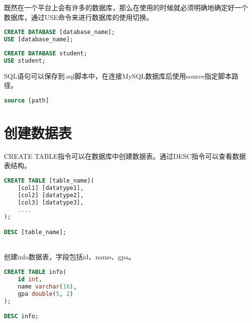 \documentclass[12pt, openany, oneside]{book}
\begin{document}
既然在一个平台上会有许多的数据库，那么在使用的时候就必须明确地确定好一个数据库，通过USE命令来进行数据库的使用切换。

\vspace{-0.5cm}

\begin{lstlisting}[language=SQL]
CREATE DATABASE [database_name];
USE [database_name];
\end{lstlisting}

\vspace{0.5cm}


\begin{lstlisting}[language=SQL]
CREATE DATABASE student;
USE student;
\end{lstlisting}

SQL语句可以保存到.sql脚本中，在连接MySQL数据库后使用source指定脚本路径。

\vspace{-0.5cm}

\begin{lstlisting}[language=SQL]
source [path]
\end{lstlisting}

\vspace{0.5cm}

\section{创建数据表}

CREATE TABLE指令可以在数据库中创建数据表。通过DESC指令可以查看数据表结构。

\vspace{-0.5cm}

\begin{lstlisting}[language=SQL]
CREATE TABLE [table_name](
    [col1] [datatype1],
    [col2] [datatype2],
    [col3] [datatype3],
    ....
);

DESC [table_name];
\end{lstlisting}

\vspace{0.5cm}

\\

创建info数据表，字段包括id、name、gpa。

\vspace{-0.5cm}

\begin{lstlisting}[language=SQL]
CREATE TABLE info(
    id int, 
    name varchar(16), 
    gpa double(5, 2)
);

DESC info;
\end{lstlisting}
\end{document}
